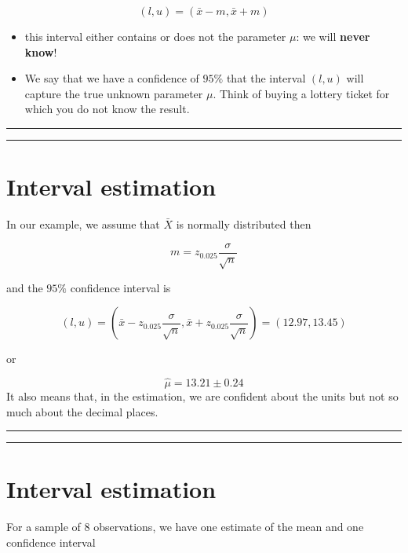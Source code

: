 \documentclass[
]{book}
\begin{document}
\[(l,u)=(\bar{x} - m,\bar{x} + m)\]

\begin{itemize}
\item
  this interval either contains or does not the parameter \(\mu\): we will \textbf{never know}!
\item
  We say that we have a confidence of \(95\%\) that the interval \((l,u)\) will capture the true unknown parameter \(\mu\). Think of buying a lottery ticket for which you do not know the result.
\end{itemize}

\begin{center}\rule{0.5\linewidth}{0.5pt}\end{center}

\begin{center}\rule{0.5\linewidth}{0.5pt}\end{center}

\hypertarget{interval-estimation-4}{%
\section{Interval estimation}\label{interval-estimation-4}}

In our example, we assume that \(\bar{X}\) is normally distributed then

\[m=z_{0.025} \frac{\sigma}{\sqrt{n}}\]

and the \(95\%\) confidence interval is

\[(l,u)=(\bar{x}-z_{0.025} \frac{\sigma}{\sqrt{n}}, \bar{x}+z_{0.025} \frac{\sigma}{\sqrt{n}})= (12.97,13.45)\]

or

\[\hat{\mu}=13.21 \pm 0.24\]
It also means that, in the estimation, we are confident about the units but not so much about the decimal places.

\begin{center}\rule{0.5\linewidth}{0.5pt}\end{center}

\begin{center}\rule{0.5\linewidth}{0.5pt}\end{center}

\hypertarget{interval-estimation-5}{%
\section{Interval estimation}\label{interval-estimation-5}}

For a sample of 8 observations, we have one estimate of the mean and one confidence interval
\end{document}

